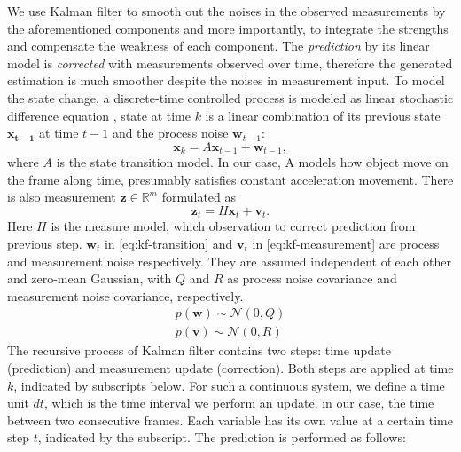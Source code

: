 We use Kalman filter to smooth out the noises in the observed measurements by the aforementioned components and more importantly, to integrate the strengths and compensate the weakness of each component. The \emph{prediction} by its linear model is \emph{corrected} with measurements observed over time, therefore the generated estimation is much smoother despite the noises in measurement input. 
To model the state change, a discrete-time controlled process is modeled as linear stochastic difference equation \cite{Welch:1995:IKF:897831}, state at time $k$ is a linear combination of its previous state $\mathbf{x_{t-1}}$ at time $t-1$
and the process noise $\mathbf{w}_{t-1}$:
\begin{equation}
  \mathbf{x}_k = A\mathbf{x}_{t-1} + \mathbf{w}_{t-1}, \label{eq:kf-transition}
\end{equation}
where $A$ is the state transition model.
In our case, A models how object move on the frame along time, presumably satisfies constant acceleration movement.
There is also measurement $\mathbf{z}\in \mathbb{R}^{m}$ formulated as
\begin{equation}
\mathbf{z}_t = H\mathbf{x}_t+\mathbf{v}_t.
\label{eq:kf-measurement}
\end{equation}
Here $H$ is the measure model, which observation to correct prediction from previous step. $\mathbf{w}_t$ in \ref{eq:kf-transition} and $\mathbf{v}_t$ in \ref{eq:kf-measurement} are process and measurement noise respectively. They are assumed independent of each other and zero-mean Gaussian, with $Q$ and $R$ as process noise covariance and measurement noise covariance, respectively.
\begin{align}
p(\mathbf{w})\sim \mathcal{N}(0, Q)\\
p(\mathbf{v})\sim \mathcal{N}(0, R)
\end{align}
The recursive process of Kalman filter contains two steps: time update (prediction) and measurement update (correction). Both steps are applied at time $k$, indicated by subscripts below.
For such a continuous system, we define a time unit $dt$, which is the time interval we perform an update, in our case, the time between two consecutive frames. Each variable has its own value at a certain time step $t$, indicated by the subscript. The prediction is performed as follows: 
